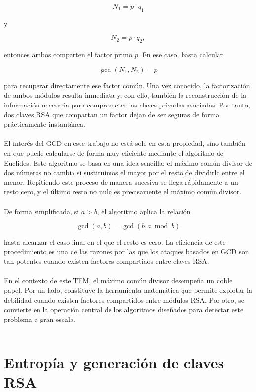 \[
N_1 = p \cdot q_1
\]

y

\[
N_2 = p \cdot q_2,
\]

entonces ambos comparten el factor primo \(p\). En ese caso, basta calcular

\[
\gcd(N_1,N_2)=p
\]

para recuperar directamente ese factor común. Una vez conocido, la factorización de ambos módulos resulta inmediata y, con ello, también la reconstrucción de la información necesaria para comprometer las claves privadas asociadas. Por tanto, dos claves RSA que compartan un factor dejan de ser seguras de forma prácticamente instantánea.
\\
\\
El interés del GCD en este trabajo no está solo en esta propiedad, sino también en que puede calcularse de forma muy eficiente mediante el algoritmo de Euclides. Este algoritmo se basa en una idea sencilla: el máximo común divisor de dos números no cambia si sustituimos el mayor por el resto de dividirlo entre el menor. Repitiendo este proceso de manera sucesiva se llega rápidamente a un resto cero, y el último resto no nulo es precisamente el máximo común divisor.
\\
\\
De forma simplificada, si \(a>b\), el algoritmo aplica la relación

\[
\gcd(a,b)=\gcd(b,a \bmod b)
\]

hasta alcanzar el caso final en el que el resto es cero. La eficiencia de este procedimiento es una de las razones por las que los ataques basados en GCD son tan potentes cuando existen factores compartidos entre claves RSA.
\\
\\
En el contexto de este TFM, el máximo común divisor desempeña un doble papel. Por un lado, constituye la herramienta matemática que permite explotar la debilidad cuando existen factores compartidos entre módulos RSA. Por otro, se convierte en la operación central de los algoritmos diseñados para detectar este problema a gran escala.
\\
\\

\section{Entropía y generación de claves RSA}

